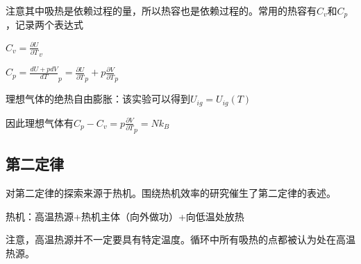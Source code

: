 \documentclass[a4paper, 10pt, openany]{book}%
\begin{document}
注意其中吸热是依赖过程的量，所以热容也是依赖过程的。常用的热容有$C_v$和$C_p$，记录两个表达式

$C_v=\frac{\partial U}{\partial T}_v$

$C_p=\frac{dU+pdV}{dT}_p=\frac{\partial U}{\partial T}_p+p\frac{\partial V}{\partial T}_p$

理想气体的绝热自由膨胀：该实验可以得到$U_{ig}=U_{ig}(T)$

因此理想气体有$C_p-C_v=p\frac{\partial V}{\partial T}_p=Nk_B$

\subsection{第二定律}
对第二定律的探索来源于热机。围绕热机效率的研究催生了第二定律的表述。

热机：高温热源+热机主体（向外做功）+向低温处放热

注意，高温热源并不一定要具有特定温度。循环中所有吸热的点都被认为处在高温热源。
\end{document}
